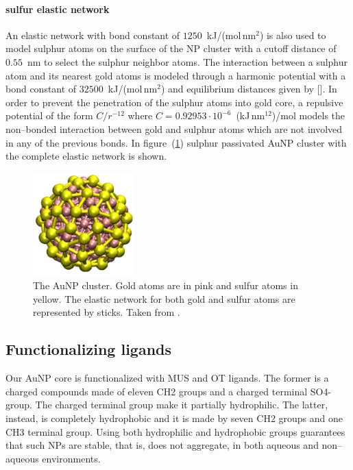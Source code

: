 \paragraph{\textbf{sulfur elastic network}} An elastic network with bond constant of $1250$~kJ/(mol\,nm$^2$) is also used to model sulphur atoms on the surface of the \ac{NP} cluster with a cutoff distance of $0.55$~nm to select the sulphur neighbor atoms. The interaction between a sulphur atom and its nearest gold atoms is modeled through a harmonic potential with a bond constant of $32500$~kJ/(mol\,nm$^2$) and equilibrium distances given by []. In order to prevent the penetration of the sulphur atoms into gold core, a repulsive potential of the form $C/r^{-12}$ where $C = 0.92953\cdot 10^{-6}$~(kJ\,nm$^{12}$)/mol models the non--bonded interaction between gold and sulphur atoms which are not involved in any of the previous bonds. In figure~(\ref{fig:NPCluster}) sulphur passivated \ac{AuNP} cluster with the complete elastic network is shown. 
\begin{figure}
	\centering
	\includegraphics[width=0.35\textwidth]{./img/NPCluster}
	\caption{The \acs{AuNP} cluster. Gold atoms are in pink and sulfur atoms in yellow. The elastic network for both gold and sulfur atoms are represented by sticks. Taken from \cite{ourPaper}.}
	\label{fig:NPCluster}
\end{figure}


\subsection{Functionalizing ligands}
Our \ac{AuNP} core is functionalized with \ac{MUS} and \ac{OT} ligands. The former is a charged compounds made of eleven \ac{CH2} groups and a charged terminal \ac{SO4-} group. The charged terminal group make it partially hydrophilic. The latter, instead, is completely hydrophobic and it is made by seven \ac{CH2} groups and one \ac{CH3} terminal group. Using both hydrophilic and hydrophobic groups guarantees that such \acp{NP} are stable, that is, does not aggregate, in both aqueous and non--aqueous environments.

